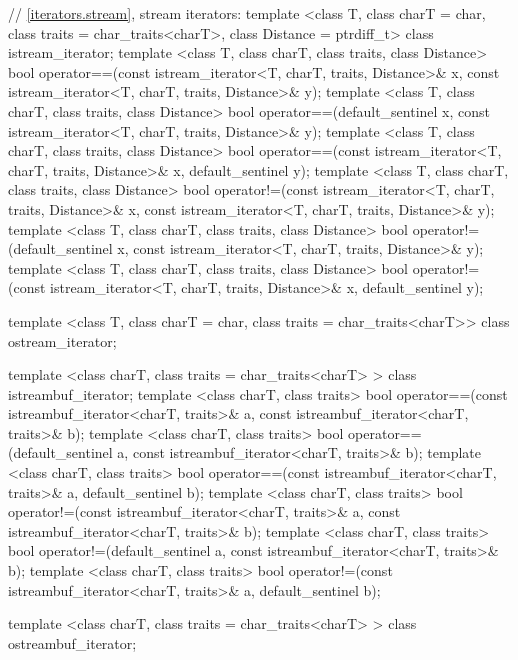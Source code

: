 \begin{codeblock}
{{{{  // \ref{iterators.stream}, stream iterators:
  template <class T, class charT = char, class traits = char_traits<charT>,
      class Distance = ptrdiff_t>
  class istream_iterator;
  template <class T, class charT, class traits, class Distance>
    bool operator==(const istream_iterator<T, charT, traits, Distance>& x,
            const istream_iterator<T, charT, traits, Distance>& y);
  template <class T, class charT, class traits, class Distance>
    bool operator==(default_sentinel x,
            const istream_iterator<T, charT, traits, Distance>& y);
  template <class T, class charT, class traits, class Distance>
    bool operator==(const istream_iterator<T, charT, traits, Distance>& x,
            default_sentinel y);
  template <class T, class charT, class traits, class Distance>
    bool operator!=(const istream_iterator<T, charT, traits, Distance>& x,
            const istream_iterator<T, charT, traits, Distance>& y);
  template <class T, class charT, class traits, class Distance>
   bool operator!=(default_sentinel x,
            const istream_iterator<T, charT, traits, Distance>& y);
  template <class T, class charT, class traits, class Distance>
    bool operator!=(const istream_iterator<T, charT, traits, Distance>& x,
            default_sentinel y);

  template <class T, class charT = char, class traits = char_traits<charT>>
      class ostream_iterator;

  template <class charT, class traits = char_traits<charT> >
    class istreambuf_iterator;
  template <class charT, class traits>
    bool operator==(const istreambuf_iterator<charT, traits>& a,
            const istreambuf_iterator<charT, traits>& b);
  template <class charT, class traits>
    bool operator==(default_sentinel a,
            const istreambuf_iterator<charT, traits>& b);
  template <class charT, class traits>
    bool operator==(const istreambuf_iterator<charT, traits>& a,
            default_sentinel b);
  template <class charT, class traits>
    bool operator!=(const istreambuf_iterator<charT, traits>& a,
            const istreambuf_iterator<charT, traits>& b);
  template <class charT, class traits>
    bool operator!=(default_sentinel a,
            const istreambuf_iterator<charT, traits>& b);
  template <class charT, class traits>
    bool operator!=(const istreambuf_iterator<charT, traits>& a,
            default_sentinel b);

  template <class charT, class traits = char_traits<charT> >
    class ostreambuf_iterator;

}}}}
\end{codeblock}
